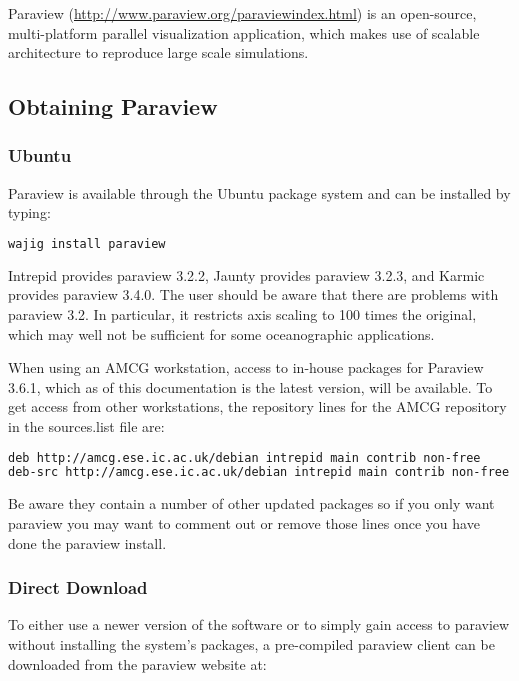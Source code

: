 
Paraview (\url{http://www.paraview.org/paraviewindex.html}) is an open-source, multi-platform parallel visualization application, which makes use of scalable architecture to reproduce large scale simulations.

\subsection{Obtaining Paraview}
\subsubsection{Ubuntu}
Paraview is available through the Ubuntu package system and can be installed by typing: 

\begin{example}
  \begin{lstlisting}[language=bash]
wajig install paraview
\end{lstlisting}
\end{example}

Intrepid provides paraview 3.2.2, Jaunty provides paraview 3.2.3, and Karmic
provides paraview 3.4.0. The user should be aware that there are problems
with paraview 3.2. In particular, it restricts axis scaling to 100 times the
original, which may well not be sufficient for some oceanographic
applications.

When using an AMCG workstation, access to in-house packages for Paraview
3.6.1, which as of this documentation is the latest version, will be
available. To get access from other workstations, the repository lines for
the AMCG repository in the sources.list file are:

\begin{example}
  \begin{lstlisting}[language=bash]
deb http://amcg.ese.ic.ac.uk/debian intrepid main contrib non-free
deb-src http://amcg.ese.ic.ac.uk/debian intrepid main contrib non-free
\end{lstlisting}
\end{example}

Be aware they contain a number of other updated packages so if you only want
paraview you may want to comment out or remove those lines once you have
done the paraview install.

\subsubsection{Direct Download}

To either use a newer version of the software or to simply gain access to
paraview without installing the system's packages, a pre-compiled paraview
client can be downloaded from the paraview website at:

